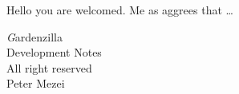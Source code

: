 \documentclass{article}
\begin{document}
Hello \makebox[5cm]{\dotfill} you are welcomed. Me as \makebox[5cm]{\dotfill} aggrees that \dots



\newpage
\todototoc
\listoftodos

\newpage
\thispagestyle{empty}
\vspace*{5cm}
\begin{center}
  {\textit Gardenzilla\\ Development Notes \\ \vspace{5mm}
    All right reserved \\ Peter Mezei \\\the\year{}}
\end{center}
\end{document}
